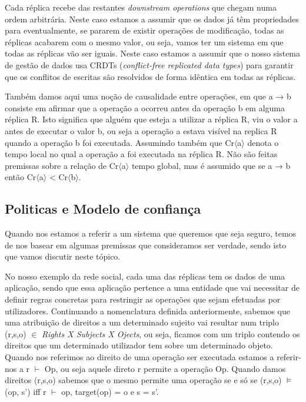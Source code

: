 \documentclass[runningheads,a4paper]{llncs}
\begin{document}
Cada réplica recebe das restantes \textit{downstream operations} que chegam numa ordem arbitrária. Neste caso estamos a assumir que os dados já têm propriedades para eventualmente, se pararem de existir operações de modificação, todas as réplicas acabarem com o mesmo valor, ou seja, vamos ter um sistema em que todas as réplicas vão ser iguais. Neste caso estamos a assumir que o nosso sistema de gestão de dados usa CRDTs (\textit{conflict-free replicated data types}) \cite{riak} \cite{zawirski2015write} \cite{shapiro2011conflict}  para garantir que os conflitos de escritas são resolvidos de forma idêntica em todas as réplicas. 

Também damos aqui uma noção de causalidade entre operações, em que a → b consiste em afirmar que 
a operação a ocorreu antes da operação b em alguma réplica R. Isto significa que alguém que esteja a utilizar a réplica R, viu o valor a antes de executar o valor b, ou seja a operação a estava visível na replica R quando a operação b foi executada.
Assumindo também que Cr$\langle$a$\rangle$ denota o tempo local no qual a operação a foi executada na réplica R. Não são feitas premissas sobre a relação de Cr$\langle$a$\rangle$ tempo global, mas é assumido que se a → b então Cr$\langle$a$\rangle$ < Cr$\langle$b$\rangle$.


\subsection{Politicas e Modelo de confiança} \label{p}

Quando nos estamos a referir a um sistema que queremos que seja seguro, temos de nos basear em algumas premissas que consideramos ser verdade, sendo isto que vamos discutir neste tópico. 

No nosso exemplo da rede social, cada uma das réplicas tem os dados de uma aplicação, sendo que essa aplicação pertence a uma entidade que vai necessitar de definir regras concretas para restringir as operações que sejam efetuadas por utilizadores. Continuando a nomenclatura definida anteriormente, sabemos que uma atribuição de direitos a um determinado sujeito vai resultar num triplo (r,s,o) $\in$ \textit{Rights X Subjects X Ojects}, ou seja, ficamos com um triplo contendo os direitos que um determinado utilizador tem sobre um determinado objeto. Quando nos referimos ao direito de uma operação ser executada estamos a referir-nos a r $\vdash$ Op, ou seja aquele direto r permite a operação Op. Quando damos direitos (r,s,o) sabemos que o mesmo permite uma operação se e só se (r,s,o) $\models$ (op, s') iff r $\vdash$ op, target(op) = o e s = s'. 
\end{document}
